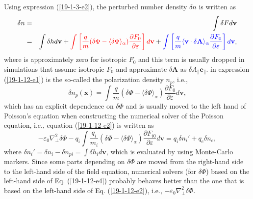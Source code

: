 \documentclass{llncs}
\newcommand{\tmcolor}[2]{{\color{#1}{#2}}}
\begin{document}
Using expression (\ref{19-1-3-e2}), the perturbed number density $\delta n$ is
written as
\begin{eqnarray}
  \delta n & = & \int \delta F d\mathbf{v} \nonumber\\
  & = & \int \delta h d\mathbf{v}+ \tmcolor{red}{\int \left[ \frac{q}{m}
  (\delta \Phi - \langle \delta \Phi \rangle_{\alpha}) \frac{\partial
  F_0}{\partial \varepsilon} \right] d\mathbf{v}} + \tmcolor{blue}{\int \left[
  \frac{q}{m} \langle \mathbf{v} \cdot \delta \mathbf{A} \rangle_{\alpha}
  \frac{\partial F_0}{\partial \varepsilon} \right] d\mathbf{v}}, 
  \label{19-1-12-e1}
\end{eqnarray}
where \tmcolor{blue}{the blue term} is approximately zero for isotropic $F_0$
and this term is usually dropped in simulations that assume isotropic $F_0$
and approximate $\delta \mathbf{A}$ as $\delta A_{\parallel}
\mathbf{e}_{\parallel}$. \tmcolor{red}{The red term} in expression
(\ref{19-1-12-e1}) is the so-called the polarization density $n_p$, i.e.,
\begin{equation}
  \label{18-9-13-p9} \delta n_p (\mathbf{x}) = \int \frac{q }{m} (\delta \Phi
  - \langle \delta \Phi \rangle_{\alpha}) \frac{\partial F_0}{\partial
  \varepsilon} d\mathbf{v},
\end{equation}
which has an explicit dependence on $\delta \Phi$ and is usually moved to the
left hand of Poisson's equation when constructing the numerical solver of the
Poisson equation, i.e., equation (\ref{19-1-12-e2}) is written as
\begin{equation}
  \label{19-1-12-e4} - \varepsilon_0 \nabla^2_{\perp} \delta \Phi - q_i \int
  \frac{q_i}{m_i} (\delta \Phi - \langle \delta \Phi \rangle_{\alpha})
  \frac{\partial F_{i 0}}{\partial \varepsilon} d\mathbf{v}= q_i \delta n_i' +
  q_e \delta n_e,
\end{equation}
where $\delta n_i' = \delta n_i - \delta n_{p i} = \int \delta h_i
d\mathbf{v}$, which is evaluated by using Monte-Carlo markers. Since some
parts depending on $\delta \Phi$ are moved from the right-hand side to the
left-hand side of the field equation, numerical solvers (for $\delta \Phi$)
based on the left-hand side of Eq. (\ref{19-1-12-e4}) probably behaves better
than the one that is based on the left-hand side of Eq. (\ref{19-1-12-e2}),
i.e., $- \varepsilon_0 \nabla^2_{\perp} \delta \Phi$.
\end{document}
